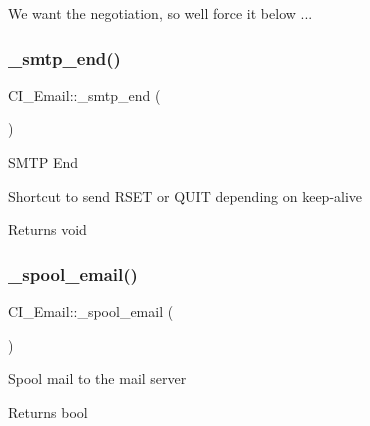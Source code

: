 We want the negotiation, so we\textquotesingle{}ll force it below ...\mbox{\label{class_c_i___email_a181a406ba1ed63ac61c3ad325ffbd375}} 
\subsubsection{\texorpdfstring{\+\_\+smtp\+\_\+end()}{\_smtp\_end()}}
{\footnotesize\ttfamily C\+I\+\_\+\+Email\+::\+\_\+smtp\+\_\+end (\begin{DoxyParamCaption}{ }\end{DoxyParamCaption})\hspace{0.3cm}{\ttfamily [protected]}}

S\+M\+TP End

Shortcut to send R\+S\+ET or Q\+U\+IT depending on keep-\/alive

\begin{DoxyReturn}{Returns}
void 
\end{DoxyReturn}
\mbox{\label{class_c_i___email_a841bfd08e15b57da914f94c958f9c32f}} 
\subsubsection{\texorpdfstring{\+\_\+spool\+\_\+email()}{\_spool\_email()}}
{\footnotesize\ttfamily C\+I\+\_\+\+Email\+::\+\_\+spool\+\_\+email (\begin{DoxyParamCaption}{ }\end{DoxyParamCaption})\hspace{0.3cm}{\ttfamily [protected]}}

Spool mail to the mail server

\begin{DoxyReturn}{Returns}
bool 
\end{DoxyReturn}
\mbox{\label{class_c_i___email_a5dd90c39949daaf68aa43875dc9073a3}} 
